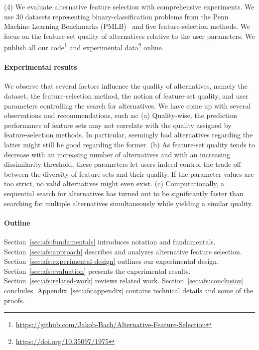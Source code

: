 \documentclass[iicol, sn-basic, Numbered]{sn-jnl} %
\theoremstyle{plain}
\theoremstyle{definition}
\begin{document}
(4) We evaluate alternative feature selection with comprehensive experiments.
We use 30 datasets representing binary-classification problems from the Penn Machine Learning Benchmarks (PMLB)~\cite{olson2017pmlb, romano2021pmlb} and five feature-selection methods. 
We focus on the feature-set quality of alternatives relative to the user parameters.
We publish all our code\footnote{\url{https://github.com/Jakob-Bach/Alternative-Feature-Selection}} and experimental data\footnote{\url{https://doi.org/10.35097/1975}} online.

\paragraph{Experimental results}

We observe that several factors influence the quality of alternatives, namely the dataset, the feature-selection method, the notion of feature-set quality, and user parameters controlling the search for alternatives.
We have come up with several observations and recommendations, such as:
(a) Quality-wise, the prediction performance of feature sets may not correlate with the quality assigned by feature-selection methods.
In particular, seemingly bad alternatives regarding the latter might still be good regarding the former.
(b) As feature-set quality tends to decrease with an increasing number of alternatives and with an increasing dissimilarity threshold, these parameters let users indeed control the trade-off between the diversity of feature sets and their quality.
If the parameter values are too strict, no valid alternatives might even exist.
(c) Computationally, a sequential search for alternatives has turned out to be significantly faster than searching for multiple alternatives simultaneously while yielding a similar quality.

\paragraph{Outline}

Section~\ref{sec:afs:fundamentals} introduces notation and fundamentals.
Section~\ref{sec:afs:approach} describes and analyzes alternative feature selection.
Section~\ref{sec:afs:experimental-design} outlines our experimental design. 
Section~\ref{sec:afs:evaluation} presents the experimental results.
Section~\ref{sec:afs:related-work} reviews related work.
Section~\ref{sec:afs:conclusion} concludes.
Appendix~\ref{sec:afs:appendix} contains technical details and some of the proofs.
\end{document}
